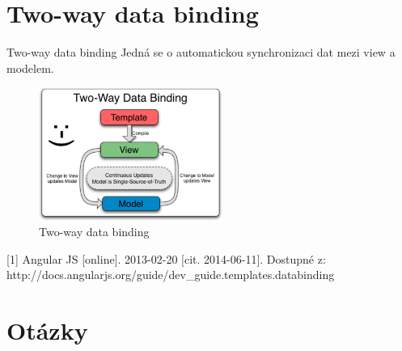\documentclass[czech]{beamer}
\begin{document}
    \section{Two-way data binding}
    \begin{frame}
        \begin{block}{Two-way data binding}
            Jedná se o automatickou synchronizaci dat mezi view a modelem.
        \end{block}
        \begin{figure}[ht]
            \centering
            \includegraphics[width=60mm]{two-way-data-binding.png}
            \caption{Two-way data binding\cite{binding}}
            \label{obr:binding}
        \end{figure}

        \begin{thebibliography}{1}
            \small [1] Angular JS [online]. 2013-02-20 [cit. 2014-06-11]. Dostupné z: http://docs.angularjs.org/guide/dev\_guide.templates.databinding
        \end{thebibliography}
    \end{frame}

    \begin{frame}
        \begin{figure}           
            \parbox{.80\linewidth}{}            
        \end{figure}
    \end{frame}
  
    \section{Otázky}
    \begin{frame}
    \end{frame}
\end{document}
